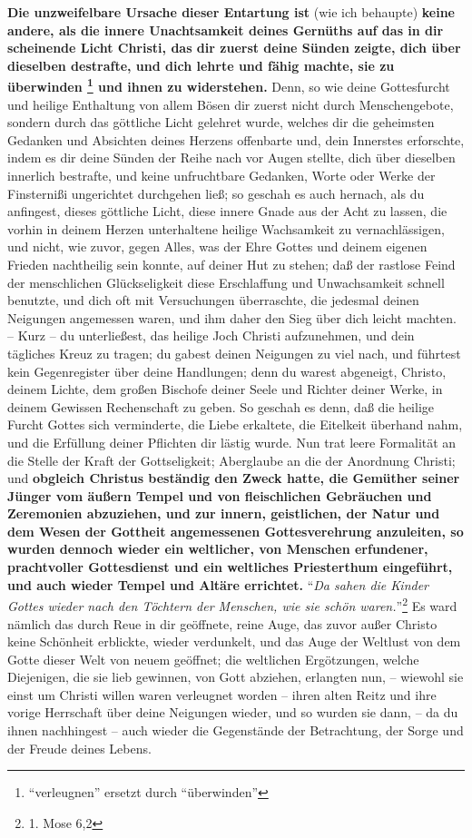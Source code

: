 \textbf{Die unzweifelbare Ursache dieser Entartung ist} (wie ich behaupte)
\textbf{keine andere,
als die innere Unachtsamkeit deines Gernüths auf das in dir scheinende Licht
Christi, das dir zuerst deine Sünden zeigte, dich über dieselben destrafte, und
dich lehrte und fähig machte, sie zu überwinden \footnote{"`verleugnen"'
ersetzt durch "`überwinden"'} und ihnen zu widerstehen.} Denn,
so wie deine Gottesfurcht und heilige Enthaltung von allem Bösen dir zuerst
nicht durch Menschengebote, sondern durch das göttliche Licht gelehret wurde,
welches dir die geheimsten Gedanken und Absichten deines Herzens offenbarte und,
dein Innerstes erforschte, indem es dir deine Sünden der Reihe nach vor Augen
stellte, dich über dieselben innerlich bestrafte, und keine unfruchtbare
Gedanken, Worte oder Werke der Finsternißi ungerichtet durchgehen ließ; so
geschah es auch hernach, als du anfingest, dieses göttliche Licht, diese innere
Gnade aus der Acht zu lassen, die vorhin in deinem Herzen unterhaltene heilige
Wachsamkeit zu vernachlässigen, und nicht, wie zuvor, gegen Alles, was der Ehre
Gottes und deinem eigenen Frieden nachtheilig sein konnte, auf deiner Hut zu
stehen; daß der rastlose Feind der menschlichen Glückseligkeit diese
Erschlaffung und Unwachsamkeit schnell benutzte, und dich oft mit Versuchungen
überraschte, die jedesmal deinen Neigungen angemessen waren, und ihm daher den
Sieg über dich leicht machten. -- Kurz -- du unterließest, das heilige Joch
Christi aufzunehmen, und dein tägliches Kreuz zu tragen; du gabest deinen
Neigungen zu viel nach, und führtest kein Gegenregister über deine Handlungen;
denn du warest abgeneigt, Christo, deinem Lichte, dem großen Bischofe deiner
Seele und Richter deiner Werke, in deinem Gewissen Rechenschaft zu geben. So
geschah es denn, daß die heilige Furcht Gottes sich verminderte, die Liebe
erkaltete, die Eitelkeit überhand nahm, und die Erfüllung deiner Pflichten dir
lästig wurde. Nun trat leere Formalität an die Stelle der Kraft der
Gottseligkeit; Aberglaube an die der Anordnung Christi; und \textbf{obgleich Christus
beständig den Zweck hatte, die Gemüther seiner Jünger vom äußern Tempel und von
fleischlichen Gebräuchen und Zeremonien abzuziehen, und zur innern, geistlichen,
der Natur und dem Wesen der Gottheit angemessenen Gottesverehrung anzuleiten, so
wurden dennoch wieder ein weltlicher, von Menschen erfundener, prachtvoller
Gottesdienst  und ein weltliches Priesterthum
 eingeführt, und auch wieder Tempel 
und Altäre errichtet.}
"`\textit{Da sahen die Kinder Gottes wieder nach den Töchtern der
Menschen, wie sie schön waren.}"'\footnote{1. Mose 6,2}
Es ward nämlich das durch
Reue in dir geöffnete, reine Auge, das zuvor außer Christo keine Schönheit
erblickte, wieder verdunkelt, und das Auge der Weltlust von dem Gotte dieser
Welt von neuem geöffnet; die weltlichen Ergötzungen, welche Diejenigen, die sie
lieb gewinnen, von Gott abziehen, erlangten nun, -- wiewohl sie einst um Christi
willen waren verleugnet worden -- ihren alten Reitz und ihre vorige Herrschaft
über deine Neigungen wieder, und so wurden sie dann, -- da du ihnen nachhingest
-- auch wieder die Gegenstände der Betrachtung, der Sorge und der Freude deines
Lebens.

